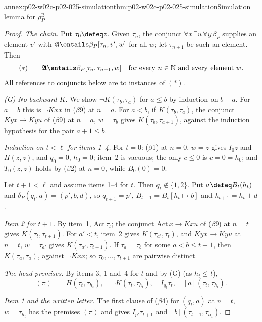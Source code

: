 \begin{annexitem}{annex:p02-w02c-p02-025-simulation}{thm:p02-w02c-p02-025-simulation}{Simulation lemma for \(\rho^{\mathrm B}_P\)}
\begin{proof}
\emph{The chain.}  Put \(\tau_0\defeq z\).  Given \(\tau_n\), the conjunct
\(\forall x\,\exists u\,\forall y\,\beta_P\) supplies an element \(v'\) with
\(\mathfrak A\entails\beta_P[\tau_n,v',w]\) for all \(w\); let \(\tau_{n+1}\) be
such an element.  Then
\[
 (\ast)\qquad \mathfrak A\entails\beta_P[\tau_n,\tau_{n+1},w]
 \quad\text{for every }n\in\mathbb N\text{ and every element }w .
\]
All references to conjuncts below are to instances of \((\ast)\).

\emph{(G) No backward \(K\).}  We show \(\neg K(\tau_b,\tau_a)\) for \(a\leq b\) by
induction on \(b-a\).  For \(a=b\) this is \(\neg Kxx\) in (\(\beta\)9) at
\(n=a\).  For \(a<b\), if \(K(\tau_b,\tau_a)\), the conjunct \(Kyx\to Kyu\) of
(\(\beta\)9) at \(n=a\), \(w=\tau_b\) gives \(K(\tau_b,\tau_{a+1})\), against the
induction hypothesis for the pair \(a+1\leq b\).

\emph{Induction on \(t<\ell\) for items 1--4.}  For \(t=0\): (\(\beta\)1) at
\(n=0\), \(w=z\) gives \(I_0z\) and \(H(z,z)\), and \(q_0=0\), \(h_0=0\); item~2 is
vacuous; the only \(c\leq0\) is \(c=0=h_0\); and \(T_0(z,z)\) holds by (\(\beta\)2)
at \(n=0\), while \(B_0(0)=0\).

Let \(t+1<\ell\) and assume items 1--4 for \(t\).  Then \(q_t\notin\{1,2\}\).
Put \(a\defeq B_t(h_t)\) and \(\delta_P(q_t,a)=(p',b,d)\), so
\(q_{t+1}=p'\), \(B_{t+1}=B_t[h_t\mapsto b]\) and \(h_{t+1}=h_t+d\).

\emph{Item 2 for \(t+1\).}  By item~1, \(\mathrm{Act}\,\tau_t\); the conjunct
\(\mathrm{Act}\,x\to Kxu\) of (\(\beta\)9) at \(n=t\) gives
\(K(\tau_t,\tau_{t+1})\).  For \(a'<t\), item~2 gives \(K(\tau_{a'},\tau_t)\), and
\(Kyx\to Kyu\) at \(n=t\), \(w=\tau_{a'}\) gives \(K(\tau_{a'},\tau_{t+1})\).  If
\(\tau_a=\tau_b\) for some \(a<b\leq t+1\), then \(K(\tau_a,\tau_a)\), against
\(\neg Kxx\); so \(\tau_0,\ldots,\tau_{t+1}\) are pairwise distinct.

\emph{The head premises.}  By items 3, 1 and~4 for \(t\) and by (G) (as
\(h_t\leq t\)),
\[
 (\pi)\qquad H(\tau_t,\tau_{h_t}),\quad \neg K(\tau_t,\tau_{h_t}),\quad
 I_{q_t}\tau_t,\quad [a](\tau_t,\tau_{h_t}).
\]

\emph{Item 1 and the written letter.}  The first clause of (\(\beta\)4) for
\((q_t,a)\) at \(n=t\), \(w=\tau_{h_t}\) has the premises \((\pi)\) and gives
\(I_{p'}\tau_{t+1}\) and \([b](\tau_{t+1},\tau_{h_t})\).


\end{proof}
\end{annexitem}
